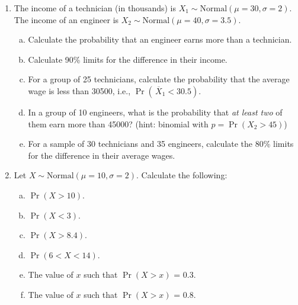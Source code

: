 \documentclass[a4paper,12pt]{article}
\begin{document}
\begin{enumerate}
\begin{enumerate}[(a)]
\end{enumerate}






\item 

The income of a technician (in thousands) is $X_1 \sim \text{Normal}(\mu=30,\sigma=2)$. The income of an engineer is $X_2 \sim \text{Normal}(\mu=40,\sigma=3.5)$. 

\begin{enumerate}[(a)]

\item Calculate the probability that an engineer earns more than a technician. \item Calculate 90\% limits for the difference in their income. \item For a group of 25 technicians, calculate the probability that the average wage is less than 30500, i.e., $\Pr(\,\overline{\!X}_1 < 30.5)$. \item In a group of 10 engineers, what is the probability that \emph{at least two} of them earn more than 45000? (hint: binomial with $p = \Pr(X_2 > 45)$) \item For a sample of 30 technicians and 35 engineers, calculate the 80\% limits for the difference in their average wages.

\end{enumerate}






\item 

Let $X \sim \text{Normal}(\mu=10,\sigma=2)$. Calculate the following:

\begin{enumerate}[(a)]

\item $\Pr(X>10)$. \item $\Pr(X<3)$. \item $\Pr(X>8.4)$. \item $\Pr(6<X<14)$. \item The value of $x$ such that $\Pr(X>x)$ = 0.3. \item The value of $x$ such that $\Pr(X>x)$ = 0.8.

\end{enumerate}




\end{enumerate}
\end{document}
